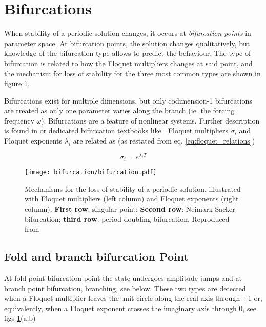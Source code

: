 
\section{Bifurcations}
\label{sec:bifurcations}

When stability of a periodic solution changes, it occurs at \textit{bifurcation
  points} in parameter space. At bifurcation points, the solution changes
qualitatively, but knowledge of the bifurcation type allows to predict the
behaviour. The type of bifurcation is related to how the Floquet multipliers
changes at said point, and the mechanism for loss of stability for the three
most common types are shown in figure \ref{fig:bifurcation}.

Bifurcations exist for multiple dimensions, but only codimension-1 bifurcations
are treated as only one parameter varies along the branch (ie. the forcing
frequency $\omega$). Bifurcations are a feature of nonlinear systems. Further
description is found in \textcite{juel2003a} or dedicated bifurcation textbooks
like \textcite{kuznetsov2013a}. Floquet multipliers $\sigma_i$ and Floquet
exponents $\lambda_i$ are related as (as restated from eq.
\eqref{eq:floquet_relations})

\begin{equation}
  \sigma_i = e^{\lambda_i T}
\end{equation}

\begin{figure}
  \centering
  \texttt{[image: bifurcation/bifurcation.pdf]}
  \caption{Mechanisms for the loss of stability of a periodic solution,
    illustrated with Floquet multipliers (left column) and Floquet exponents
    (right column).
    \textbf{First row}: singular point;
    \textbf{Second row}: Neimark-Sacker bifurcation;
    \textbf{third row}: period doubling bifurcation.
    Reproduced from \parencite{detroux2016_phd}}
  \label{fig:bifurcation}
\end{figure}

\subsection{Fold and branch bifurcation Point}
\label{sec:singular_bif}

At fold point bifurcation point the state undergoes amplitude jumps and at
branch point bifurcation, branching, see below. These two types are detected when a Floquet
multiplier leaves the unit circle along the real axis through +1 or,
equivalently, when a Floquet exponent crosses the imaginary axis through 0, see
figs \ref{fig:bifurcation}(a,b)

